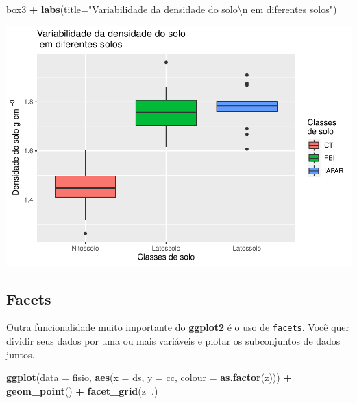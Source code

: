 \documentclass[
]{book}
\newenvironment{Shaded}{\begin{snugshade}}{\end{snugshade}}
\newcommand{\CharTok}[1]{\textcolor[rgb]{0.31,0.60,0.02}{#1}}
\newcommand{\DataTypeTok}[1]{\textcolor[rgb]{0.13,0.29,0.53}{#1}}
\newcommand{\KeywordTok}[1]{\textcolor[rgb]{0.13,0.29,0.53}{\textbf{#1}}}
\newcommand{\NormalTok}[1]{#1}
\newcommand{\OperatorTok}[1]{\textcolor[rgb]{0.81,0.36,0.00}{\textbf{#1}}}
\newcommand{\StringTok}[1]{\textcolor[rgb]{0.31,0.60,0.02}{#1}}
\begin{document}
\begin{Shaded}
\begin{Highlighting}[]
\NormalTok{box3 }\OperatorTok{+}\StringTok{ }\KeywordTok{labs}\NormalTok{(}\DataTypeTok{title=}\StringTok{"Variabilidade da densidade do solo}\CharTok{\textbackslash{}n}\StringTok{ em diferentes solos"}\NormalTok{)}
\end{Highlighting}
\end{Shaded}

\includegraphics{TudodoR_files/figure-latex/unnamed-chunk-219-2.pdf}

\hypertarget{facets}{%
\subsection{Facets}\label{facets}}

Outra funcionalidade muito importante do \textbf{ggplot2} é o uso de \texttt{facets}.
Você quer dividir seus dados por uma ou mais variáveis e plotar os subconjuntos de dados juntos.

\begin{Shaded}
\begin{Highlighting}[]
\KeywordTok{ggplot}\NormalTok{(}\DataTypeTok{data =}\NormalTok{ fisio, }\KeywordTok{aes}\NormalTok{(}\DataTypeTok{x =}\NormalTok{ ds, }\DataTypeTok{y =}\NormalTok{ cc, }\DataTypeTok{colour =} \KeywordTok{as.factor}\NormalTok{(z))) }\OperatorTok{+}
\StringTok{  }\KeywordTok{geom_point}\NormalTok{() }\OperatorTok{+}
\StringTok{  }\KeywordTok{facet_grid}\NormalTok{(z}\OperatorTok{~}\NormalTok{.)}
\end{Highlighting}
\end{Shaded}
\end{document}
